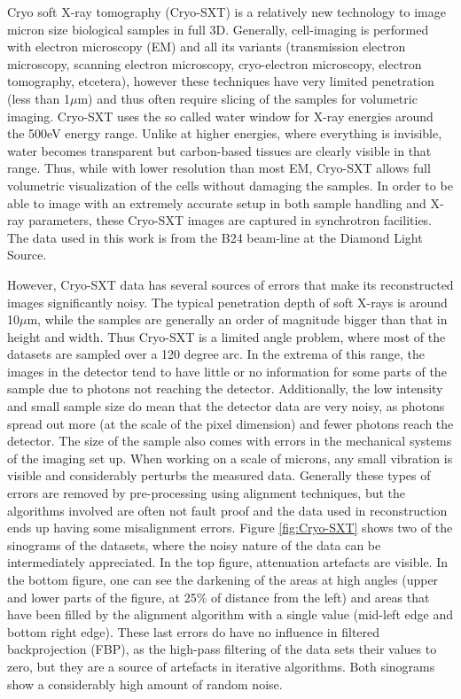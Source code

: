 Cryo soft X-ray tomography (Cryo-SXT) is a relatively new\cite{carzaniga2014cryo} technology to image micron size biological samples in full 3D. Generally, cell-imaging is performed with electron microscopy (EM) and all its variants (transmission electron microscopy, scanning electron microscopy, cryo-electron microscopy, electron tomography, etcetera), however these techniques have very limited penetration (less than 1$\mu$m) and thus often require slicing of the samples for volumetric imaging. Cryo-SXT uses the so called water window for X-ray energies around the 500eV energy range. Unlike at higher energies, where everything is invisible, water becomes transparent but carbon-based tissues are clearly visible in that range. Thus, while with lower resolution than most EM, Cryo-SXT allows full volumetric visualization of the cells without damaging the samples. In order to be able to image with an extremely accurate setup in both sample handling and X-ray parameters, these Cryo-SXT images are captured in synchrotron facilities. The data used in this work is from the B24 beam-line at the Diamond Light Source.

However, Cryo-SXT data has several sources of errors that make its reconstructed images significantly noisy. The typical penetration depth of soft X-rays is around 10$\mu$m, while the samples are generally an order of magnitude bigger than that in height and width. Thus Cryo-SXT is a limited angle problem, where most of the datasets are sampled over a 120 degree arc. In the extrema of this range, the images in the detector tend to have little or no information for some parts of the sample due to photons not reaching the detector. Additionally, the low intensity and small sample size do mean that the detector data are very noisy, as photons spread out more (at the scale of the pixel dimension) and fewer photons reach the detector. The size of the sample also comes with errors in the mechanical systems of the imaging set up. When working on a scale of microns, any small vibration is visible and considerably perturbs the measured data. Generally these types of errors are removed by pre-processing using alignment techniques, but the algorithms involved are often not fault proof and the data used in reconstruction ends up having some misalignment errors. Figure \ref{fig:Cryo-SXT} shows two of the sinograms of the datasets, where the noisy nature of the data can be intermediately appreciated. In the top figure, attenuation artefacts are visible. In the bottom figure, one can see the darkening of the areas at high angles (upper and lower parts of the figure, at 25\% of distance from the left) and areas that have been filled by the alignment algorithm with a single value (mid-left edge and bottom right edge). These last errors do have no influence in filtered backprojection (FBP), as the high-pass filtering of the data sets their values to zero, but they are a source of artefacts in iterative algorithms. Both sinograms show a considerably high amount of random noise.

